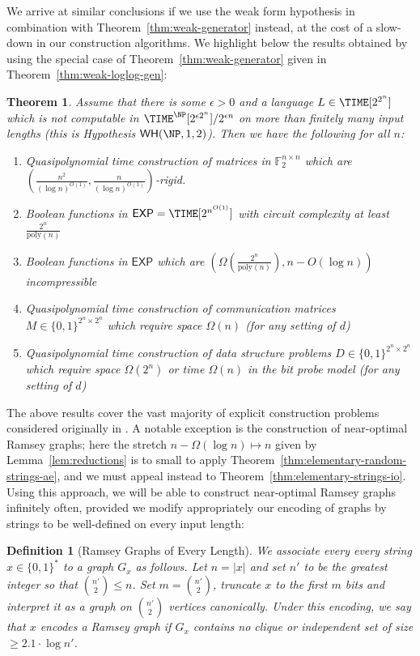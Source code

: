 \documentclass[11pt]{article}
\newtheorem{theorem}{Theorem}
\newtheorem{definition}{Definition}
\newcommand{\B}{\{0,1\}}
\newcommand{\WH}{\mathsf{WH}}
\renewcommand{\poly}{\mathrm{poly}}
\begin{document}
We arrive at similar conclusions if we use the weak form hypothesis in combination with Theorem~\ref{thm:weak-generator} instead, at the cost of a slow-down in our construction algorithms. We highlight below the results obtained by using the special case of Theorem~\ref{thm:weak-generator} given in Theorem~\ref{thm:weak-loglog-gen}:
\begin{theorem}\label{thm:conditional-ecs-weak}
Assume that there is some $\epsilon > 0$ and a language $L \in \TIME[2^{2^n}]$ which is not computable in $\TIME^\NP[2^{\epsilon 2^n}]/2^{\epsilon n}$ on more than finitely many input lengths (this is Hypothesis $\WH(\NP,1,2)$). Then we have the following for all $n$:
\begin{enumerate}
    \item \sloppy Quasipolynomial time construction of matrices in $\mathbb{F}_2^{n \times n}$ which are $(\frac{n^2}{(\log n)^{O(1)}}, \frac{n}{(\log n)^{O(1)}})$-rigid. 
    \item Boolean functions in $\mathsf{EXP} = \TIME[2^{n^{O(1)}}]$ with circuit complexity at least $ \frac{2^n}{\poly(n)}$
    \item \sloppy Boolean functions in $\mathsf{EXP}$ which are ${(\Omega(\frac{2^n}{\poly(n)}), n- O(\log n))}$ incompressible
    \item Quasipolynomial time construction of communication matrices $M \in \B^{2^n \times 2^n}$ which require space $\Omega(n)$ (for any setting of $d$)
    \item Quasipolynomial time construction of data structure problems $D \in \B^{2^n \times 2^n}$ which require space $\Omega(2^n)$ or time $\Omega(n)$ in the bit probe model (for any setting of $d$)
\end{enumerate}

\end{theorem}


The above results cover the vast majority of explicit construction problems considered originally in \cite{Korten21}. A notable exception is the construction of near-optimal Ramsey graphs; here the stretch $n - \Omega(\log n) \mapsto n$ given by Lemma~\ref{lem:reductions} is to small to apply Theorem~\ref{thm:elementary-random-strings-ae}, and we must appeal instead to Theorem~\ref{thm:elementary-strings-io}. Using this approach, we will be able to construct near-optimal Ramsey graphs infinitely often, provided we modify appropriately our encoding of graphs by strings to be well-defined on every input length:
\begin{definition}[Ramsey Graphs of Every Length]
We associate every every string $x \in \B^*$ to a graph $G_x$ as follows. Let $n = |x|$ and set $n'$ to be the greatest integer so that $\binom{n'}{2}\leq n$. Set $m = \binom{n'}{2}$, truncate $x$ to the first $m$ bits and interpret it as a graph on $\binom{n'}{2}$ vertices canonically. Under this encoding, we say that $x$ encodes a Ramsey graph if $G_x$ contains no clique or independent set of size $\geq2.1 \cdot \log n'$.
\end{definition}
\end{document}
